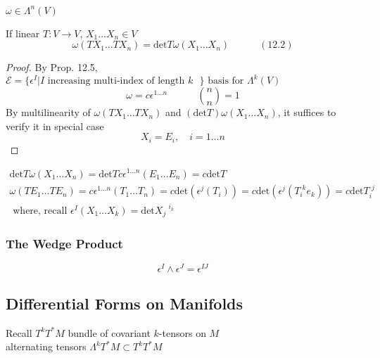 \begin{lemma}{12.6} $\omega \in \Lambda^n(V)$ 

If linear $T: V \to V$, $X_1 \dots X_n \in V$ 
\begin{equation}
  \omega(TX_1 \dots TX_n) = \text{det}{T} \omega(X_1 \dots X_n) \quad \quad \quad (12.2) 
\end{equation}

\end{lemma}

\begin{proof}
  By Prop. 12.5, $\mathcal{E} = \lbrace \epsilon^I | I \text{ increasing multi-index of length $k$ } \rbrace \text{ basis for $\Lambda^k(V)$ }$
\[
\omega = c\epsilon^{1 \dots n} \quad \quad \quad \binom{n}{n} =1 
\]
By multilinearity of $\omega(TX_1 \dots TX_n)$ and $(\text{det}{T}) \omega(X_1 \dots X_n)$, it suffices to verify it in special case
\[
X_i = E_i, \quad i = 1 \dots n
\]
\end{proof}

\[
\begin{gathered}
  \text{det}{T} \omega(X_1 \dots X_n) = \text{det}{T} c\epsilon^{1\dots n}(E_1 \dots E_n) = c\text{det}{T} \\ 
  \omega(TE_1 \dots TE_n) = c\epsilon^{1\dots n}(T_1 \dots T_n) = c\text{det}{( \epsilon^j(T_i)) } = c\text{det}{ (\epsilon^j(T_i^{ \, \, k}e_k) ) } = c\text{det}{T_i^{\, \, j}} \\ 
\text{ where, recall } \epsilon^I(X_1 \dots X_k) = \text{det}{X_j}^{ \, \, i_k}
\end{gathered}
\]




\subsubsection*{ The Wedge Product }

\begin{lemma}[14.10]
  \begin{equation}
    \epsilon^I \wedge \epsilon^J = \epsilon^{IJ}
\end{equation}
\end{lemma}

\subsection*{ Differential Forms on Manifolds }

Recall $T^k T^*M$ bundle of covariant $k$-tensors on $M$ \\
\quad alternating tensors $\Lambda^k T^*M \subset T^k T^*M$ \\

